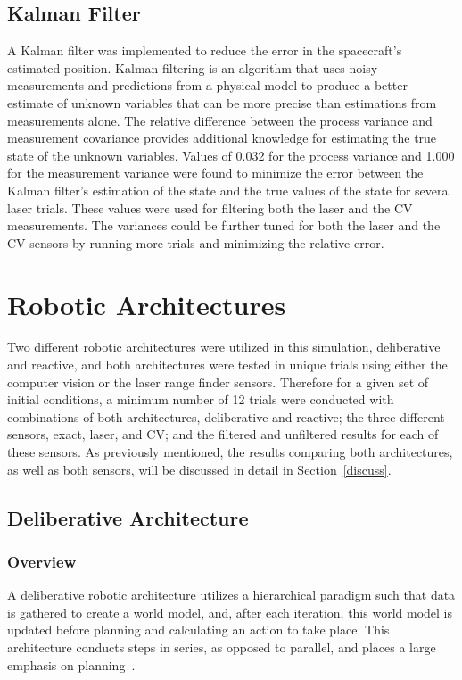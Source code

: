 \documentclass[journal, 10pt]{IEEEtran}
\begin{document}
\subsection{Kalman Filter}
A Kalman filter was implemented to reduce the error in the spacecraft's estimated position. Kalman filtering is an algorithm that uses noisy measurements and predictions from a physical model to produce a better estimate of unknown variables that can be more precise than estimations from measurements alone. The relative difference between the process variance and measurement covariance provides additional knowledge for estimating the true state of the unknown variables. Values of 0.032 for the process variance and 1.000 for the measurement variance were found to minimize the error between the Kalman filter's estimation of the state and the true values of the state for several laser trials. These values were used for filtering both the laser and the CV measurements. The variances could be further tuned for both the laser and the CV sensors by running more trials and minimizing the relative error.

\section{Robotic Architectures}
Two different robotic architectures were utilized in this simulation, deliberative and reactive, and both architectures were tested in unique trials using either the computer vision or the laser range finder sensors. Therefore for a given set of initial conditions, a minimum number of 12 trials were conducted with combinations of both architectures, deliberative and reactive; the three different sensors, exact, laser, and CV; and the filtered and unfiltered results for each of these sensors. As previously mentioned, the results comparing both architectures, as well as both sensors, will be discussed in detail in Section~\ref{discuss}.

\subsection{Deliberative Architecture}
\subsubsection{Overview}
A deliberative robotic architecture utilizes a hierarchical paradigm such that data is gathered to create a world model, and, after each iteration, this world model is updated before planning and calculating an action to take place. This architecture conducts steps in series, as opposed to parallel, and places a large emphasis on planning~\cite{joshi}.
\end{document}
